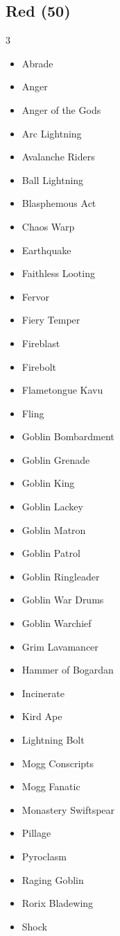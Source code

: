 \documentclass[11pt]{article}
\begin{document}
\subsection*{Red (50)}
\begin{multicols}{3}
\footnotesize
\begin{itemize}[leftmargin=1em,itemsep=0pt,parsep=0pt]
\item Abrade
\item Anger
\item Anger of the Gods
\item Arc Lightning
\item Avalanche Riders
\item Ball Lightning
\item Blasphemous Act
\item Chaos Warp
\item Earthquake
\item Faithless Looting
\item Fervor
\item Fiery Temper
\item Fireblast
\item Firebolt
\item Flametongue Kavu
\item Fling
\item Goblin Bombardment
\item Goblin Grenade
\item Goblin King
\item Goblin Lackey
\item Goblin Matron
\item Goblin Patrol
\item Goblin Ringleader
\item Goblin War Drums
\item Goblin Warchief
\item Grim Lavamancer
\item Hammer of Bogardan
\item Incinerate
\item Kird Ape
\item Lightning Bolt
\item Mogg Conscripts
\item Mogg Fanatic
\item Monastery Swiftspear
\item Pillage
\item Pyroclasm
\item Raging Goblin
\item Rorix Bladewing
\item Shock

\end{itemize}
\end{multicols}
\end{document}
